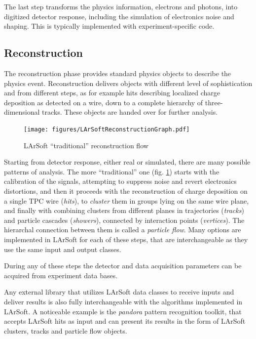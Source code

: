 \documentclass{article}
\begin{document}
The last step transforms the physics information, electrons and photons,
into digitized detector response, including the simulation of
electronics noise and shaping. This is typically implemented with
experiment-specific code.

\subsection{Reconstruction}\label{reconstruction}

The reconstruction phase provides standard physics objects to describe
the physics event. Reconstruction delivers objects with different level
of sophistication and from different steps, as for example hits
describing localized charge deposition as detected on a wire, down to a
complete hierarchy of three-dimensional tracks. These objects are handed
over for further analysis.

\begin{figure}[htbp]
\centering
\texttt{[image: figures/LArSoftReconstructionGraph.pdf]}
\caption{\label{fig:LArSoftReconstruction}LArSoft ``traditional''
reconstruction flow}
\end{figure}

Starting from detector response, either real or simulated, there are
many possible patterns of analysis. The more ``traditional'' one (fig.
\ref{fig:LArSoftReconstruction}) starts with the calibration of the
signals, attempting to suppress noise and revert electronics
distortions, and then it proceeds with the reconstruction of charge
deposition on a single TPC wire (\emph{hits}), to \emph{cluster} them in
groups lying on the same wire plane, and finally with combining clusters
from different planes in trajectories (\emph{tracks}) and particle
cascades (\emph{showers}), connected by interaction points
(\emph{vertices}). The hierarchal connection between them is called a
\emph{particle flow}. Many options are implemented in LArSoft for each
of these steps, that are interchangeable as they use the same input and
output classes.

During any of these steps the detector and data acquisition parameters
can be acquired from experiment data bases.

Any external library that utilizes LArSoft data classes to receive
inputs and deliver results is also fully interchangeable with the
algorithms implemented in LArSoft. A noticeable example is the
\emph{pandora} pattern recognition toolkit, that accepts LArSoft hits as
input and can present its results in the form of LArSoft clusters,
tracks and particle flow objects.
\end{document}
